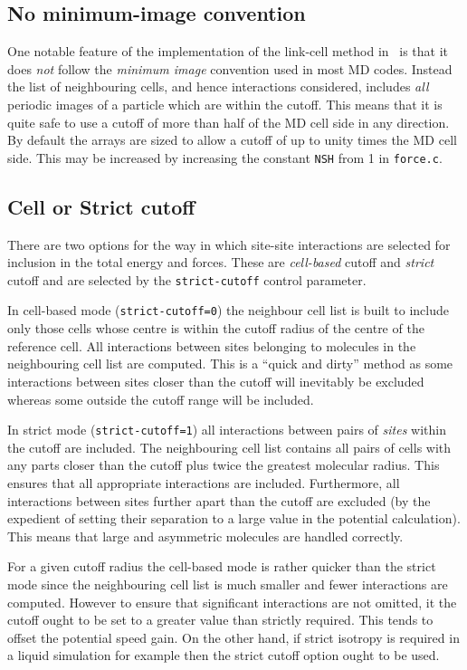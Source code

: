 \subsection{No minimum-image convention}
One notable feature of the implementation of the link-cell method in
\moldy\ is that it does {\em not\/} follow the {\em minimum image\/}
convention used in most MD codes.  Instead the list of neighbouring
cells, and hence interactions considered, includes {\em all\/} periodic
images of a particle which are within the cutoff.  This means that it
is quite safe to use a cutoff of more than half of the MD cell side in
any direction.  By default the arrays are sized to allow a cutoff of
up to unity times the MD cell side.  This may be increased by
increasing the constant \verb'NSH' from 1 in \verb`force.c`.


\subsection{Cell or Strict cutoff}
There are two options for the way in which site-site interactions are
selected for inclusion in the total energy and forces.  These are
{\em cell-based\/} cutoff and {\em strict\/} cutoff and are selected
by the \verb'strict-cutoff' control parameter.

In cell-based mode (\verb'strict-cutoff=0') the neighbour cell list is
built to include only those cells whose centre is within the cutoff
radius of the centre of the reference cell.  All interactions between
sites belonging to molecules in the neighbouring cell list are
computed.  This is a ``quick and dirty'' method as some interactions
between sites closer than the cutoff will inevitably be excluded
whereas some outside the cutoff range will be included.

In strict mode (\verb'strict-cutoff=1') all interactions between pairs
of {\em sites\/} within the cutoff are included.  The neighbouring cell
list contains all pairs of cells with any parts closer than the cutoff
plus twice the greatest molecular radius.  This ensures that all
appropriate interactions are included.  Furthermore, all interactions
between sites further apart than the cutoff are excluded (by the
expedient of setting their separation to a large value in the
potential calculation).  This means that large and asymmetric
molecules are handled correctly.  

For a given cutoff radius the cell-based mode is rather quicker than
the strict mode since the neighbouring cell list is much smaller and
fewer interactions are computed.  However to ensure that significant
interactions are not omitted, it the cutoff ought to be set to a
greater value than strictly required.    This tends to offset the
potential speed gain.   On the other hand, if strict isotropy is
required in a liquid simulation for example then the strict cutoff
option ought to be used.


